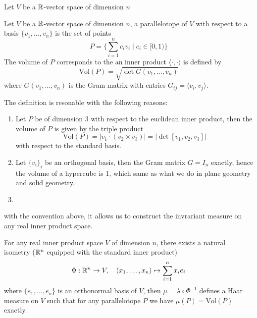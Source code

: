 \begin{definition}
    Let \(V\) be a \(\mathbb{R}\)-vector space of dimension \(n\)
\end{definition}

\begin{definition}
    Let \(V\) be a \(\mathbb{R}\)-vector space of dimension \(n\), a parallelotope of \(V\) with respect to a basis \(\{v_1, \dots, v_n\}\) is the set of points
    \[P = \{\sum_{i = 1}^n c_iv_i \mid c_i \in [0,1)\}\]
    The volume of \(P\) corresponds to the an inner product \(\langle\cdot,\cdot\rangle\) is defined by
    \[\mathrm{Vol}(P) = \sqrt{\det G(v_1,\dots,v_n)}\]
    where \(G(v_1,\dots,v_n)\) is the Gram matrix with entries \(G_{ij} = \langle v_i, v_j \rangle\).
\end{definition}

The definition is resonable with the following reasons:
\begin{enumerate}
    \item Let \(P\) be of dimension 3 with respect to the euclidean inner product, then the volume of \(P\) is given by the triple product
    \[\mathrm{Vol}(P) = |v_1\cdot(v_2\times v_3)| = |\det [v_1, v_2, v_3]|\]
    with respect to the standard basis.

    \item Let \(\{v_i\}_i\) be an orthogonal basis, then the Gram matrix \(G = I_n\) exactly, hence the volume of a hypercube is 1, which same as what we do in plane geometry and solid geometry.
    
    \item 
\end{enumerate}

with the convention above, it allows us to construct the invrariant measure on any real inner product space.

\begin{proposition}
    For any real inner product space \(V\) of dimension \(n\), there exists a natural isometry (\(\mathbb{R}^n\) equipped with the standard inner product) 
    \[\Phi: \mathbb{R}^n \to V, \quad (x_1,\dots,x_n) \mapsto \sum_{i=1}^n x_ie_i\]
    where \(\{e_1,\dots,e_n\}\) is an orthonormal basis of \(V\), then \(\mu = \lambda \circ \Phi^{-1}\) defines a Haar measure on \(V\) such that for any parallelotope \(P\) we have
    \(\mu(P) = \mathrm{Vol}(P) \) exactly.
\end{proposition}

